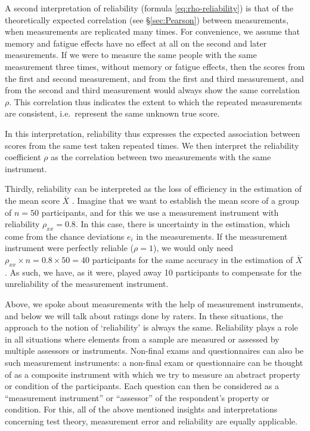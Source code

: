 \documentclass[
]{book}
\begin{document}
A second interpretation of reliability (formula \eqref{eq:rho-reliability})
is that of the theoretically expected correlation (see
§\ref{sec:Pearson}) between measurements, when measurements are replicated
many times. For convenience, we assume that memory and fatigue
effects have no effect at all on the second and later measurements. If we were to
measure the same people with the same measurement
three times, without memory or fatigue effects, then the scores from the first and
second measurement, and from the first and third measurement, and from
the second and third measurement would always show the same correlation
\(\rho\). This correlation thus indicates the extent to which the repeated measurements
are consistent, i.e.~represent the same unknown true score.

In this interpretation, reliability thus expresses the expected association
between scores from the same test taken repeated times. We then interpret the reliability
coefficient \(\rho\) as the correlation between two measurements
with the same instrument.

Thirdly, reliability can be interpreted as the loss
of efficiency in the estimation of the mean score \(\overline{X}\)
\citep[ p.474]{Ferg89}. Imagine that we want to establish the mean score of a group of
\(n=50\) participants, and for this we use a measurement instrument
with reliability \(\rho_{xx}=0.8\). In this case, there is uncertainty in the estimation,
which come from the chance deviations \(e_i\) in the measurements.
If the measurement instrument were perfectly reliable (\(\rho=1\)), we would only
need \(\rho_{xx}\times n = 0.8\times50=40\) participants for the same accuracy in
the estimation of \(\overline{X}\)
\citep[ p.474]{Ferg89}. As such, we have, as it were, played away 10 participants
to compensate for the unreliability of the measurement instrument.

Above, we spoke about measurements with the help of measurement instruments,
and below we will talk about ratings done
by raters. In these situations, the approach to the notion of `reliability'
is always the same. Reliability plays a role in all situations where
elements from a sample are measured or assessed by multiple assessors or instruments.
Non-final exams and questionnaires can also be such measurement instruments: a non-final
exam or questionnaire can be thought of as a composite instrument
with which we try to measure an abstract property or condition of the participants.
Each question can then be considered as a
``measurement instrument'' or ``assessor'' of the respondent's property or condition.
For this, all of the above mentioned insights and interpretations concerning
test theory, measurement error and reliability are equally applicable.
\end{document}
